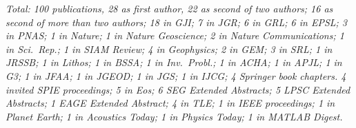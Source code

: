 \documentclass[12pt]{article}
\begin{document}
\emph{Total: 100 publications,
28 as first author,
22 as second of two authors;
16 as second of more than two authors;
18 in \emph{GJI};
7 in \emph{JGR};
6 in \emph{GRL};
6 in \emph{EPSL};
3 in \emph{PNAS};
1 in \emph{Nature};
1 in \emph{Nature Geoscience};
2 in \emph{Nature Communications};
1 in \emph{Sci.~Rep.};
1 in \emph{SIAM Review};
4 in \emph{Geophysics};
2 in \emph{GEM};
3 in \emph{SRL};
1 in \emph{JRSSB};
1 in \emph{Lithos};
1 in \emph{BSSA};
1 in \emph{Inv.~Probl.};
1 in \emph{ACHA};
1 in \emph{APJL};
1 in \emph{G3};
1 in \emph{JFAA};
1 in \emph{JGEOD};
1 in \emph{JGS};
1 in \emph{IJCG};
4 \emph{Springer} book chapters.
4 invited \emph{SPIE} proceedings;
5 in \emph{Eos};
6 \emph{SEG Extended Abstracts};
5 \emph{LPSC Extended Abstracts};
1 \emph{EAGE Extended Abstract};
4 in \emph{TLE};
1 in \emph{IEEE} proceedings;
1 in \emph{Planet Earth};
1 in \emph{Acoustics Today};
1 in \emph{Physics Today};
1 in \emph{MATLAB Digest}.}

\nocite{Bevis+2019,Dahlen+2008,Galanti+2019,Gualtieri+2020,Harig+2012,Harig+2015a,Kopp+2009,Nolet+2019,Pipatprathanporn+2022,Plattner+2014a,Plattner+2017a,Reuber+2020,Simon+2022,Simons+99,Simons+2003a,Simons+2006a,Simons+2006b,Simons+2009a,Simons+2011b,Simons+2013,Simons2010,Sukhovich+2015,Wang+2012a,Yuan+2014a,Yuan+2015}



\end{document}
